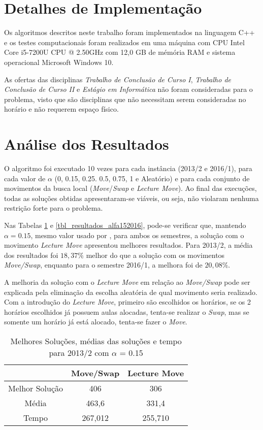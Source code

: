 \section{Detalhes de Implementação}
\label{sec-res-impl}

Os algoritmos descritos neste trabalho foram implementados na linguagem C++ e os testes computacionais foram realizados em uma máquina com CPU Intel Core i5-7200U CPU @ 2.50GHz com 12,0 GB de mémória RAM e sistema operacional Microsoft Windows 10.

As ofertas das disciplinas \textit{Trabalho de Conclusão de Curso I}, \textit{Trabalho de Conclusão de Curso II} e \textit{Estágio em Informática} não foram consideradas para o problema, visto que são disciplinas que não necessitam serem consideradas no horário e não requerem espaço físico.

\section{Análise dos Resultados}
\label{sec-res-anal}

O algoritmo foi executado 10 vezes para cada instância (2013/2 e 2016/1), para cada valor de \(\alpha\) (0, 0.15, 0.25. 0.5, 0.75, 1 e Aleatório) e para cada conjunto de movimentos da busca local (\textit{Move}/\textit{Swap} e \textit{Lecture Move}). Ao final das execuções, todas as soluções obtidas apresentaram-se viáveis, ou seja, não violaram nenhuma restrição forte para o problema.

Nas Tabelas \ref{tbl_resultados_alfa152013} e \ref{tbl_resultados_alfa152016}, pode-se verificar que, mantendo \(\alpha = 0.15\), mesmo valor usado por , para ambos os semestres, a solução com o movimento \textit{Lecture Move} apresentou melhores resultados. Para 2013/2, a média dos resultados foi \(18,37\%\) melhor do que a solução com os movimentos \textit{Move/Swap}, enquanto para o semestre 2016/1, a melhora foi de \(20,08\%\).

A melhoria da solução com o \textit{Lecture Move} em relação ao  \textit{Move/Swap} pode ser explicada pela eliminação da escolha aleatória de qual movimento seria realizado. Com a introdução do \textit{Lecture Move}, primeiro são escolhidos os horários, se os 2 horários escolhidos já possuem aulas alocadas, tenta-se realizar o \textit{Swap}, mas se somente um horário já está alocado, tenta-se fazer o \textit{Move}.

\begin{table}[!htbp]
\centering
\begin{tabular}{|c|c|c|}
\hline
 & Move/Swap & Lecture Move \\ \hline
Melhor Solução & 406 & 306 \\ \hline
Média & 463,6 & 331,4 \\ \hline
Tempo & 267,012 & 255,710 \\ \hline
\end{tabular}
\caption{Melhores Soluções, médias das soluções e tempo para 2013/2 com \(\alpha\) = 0.15}
\label{tbl_resultados_alfa152013}
\end{table}

